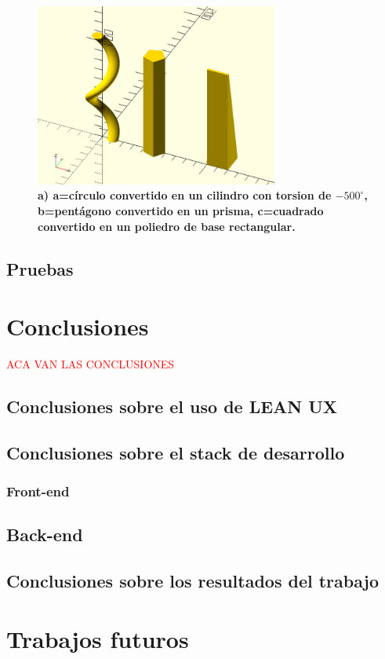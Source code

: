 \begin{figure}[h]
\includegraphics[width=8cm]{Img/Modelos/modelado19.jpg}
\centering
\caption{\textbf{\footnotesize{a) a=círculo convertido en un cilindro con torsion de $-500^\circ$, b=pentágono convertido en un prisma, c=cuadrado convertido en un poliedro de base rectangular.}}}
\end{figure}


\clearpage



\subsection{Pruebas}


\section{Conclusiones}

\textcolor{red}{ACA VAN LAS CONCLUSIONES}


\subsection{Conclusiones sobre el uso de LEAN UX}

\subsection{Conclusiones sobre el stack de desarrollo}

\subsubsection{Front-end}



\subsection{Back-end}


\subsection{Conclusiones sobre los resultados del trabajo}

\section{Trabajos futuros}



